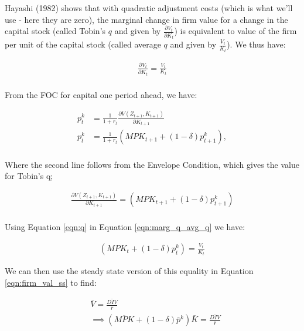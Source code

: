 \documentclass[letterpaper,12pt]{article}
\theoremstyle{definition}
\begin{document}
\begin{spacing}{1.5}
Hayashi (1982) shows that with quadratic adjustment costs (which is what we'll use - here they are zero), the marginal change in firm value for a change in the capital stock (called Tobin's $q$ and given by $\frac{\partial V_{t}}{\partial K_{t}}$) is equivalent to value of the firm per unit of the capital stock (called average $q$ and given by $\frac{V_{t}}{K_{t}}$).  We thus have:

\begin{equation}
\begin{split}
\label{eqn:marg_q_avg_q}
\frac{\partial V_{t}}{\partial{K_{t}}}=\frac{V_{t}}{K_{t}} \\
\end{split}
\end{equation}

From the FOC for capital one period ahead, we have:

\begin{equation}
\begin{split}
p^{k}_{t} &= \frac{1}{1+r_{t}}\frac{\partial V(Z_{t+1},K_{t+1})}{\partial K_{t+1}} \\
p^{k}_{t} &= \frac{1}{1+r_{t}}\left(MPK_{t+1} + (1-\delta)p^{k}_{t+1}\right), \\
\end{split}
\end{equation}

\noindent\noindent Where the second line follows from the Envelope Condition, which gives the value for Tobin's q; 

\begin{equation}
\label{eqn:q}
\begin{split}
\frac{\partial V(Z_{t+1},K_{t+1})}{\partial K_{t+1}} = \left(MPK_{t+1} + (1-\delta)p^{k}_{t+1}\right)\\
\end{split}
\end{equation}

Using Equation \ref{eqn:q} in Equation \ref{eqn:marg_q_avg_q} we have:

\begin{equation}
\label{eqn:q}
\begin{split}
\left(MPK_{t} + (1-\delta)p^{k}_{t}\right) = \frac{V_{t}}{K_{t}}
\end{split}
\end{equation}

We can then use the steady state version of this equality in Equation \ref{eqn:firm_val_ss} to find:

\begin{equation}
\label{eqn:firm_val_ss}
\begin{split}
& \bar{V} = \frac{\overline{DIV}}{\bar{r}} \\
& \implies \left(\overline{MPK} + (1-\delta)\bar{p}^{k}\right)\bar{K} =  \frac{\overline{DIV}}{\bar{r}} \\
\end{split}
\end{equation} 


\end{spacing}
\end{document}
